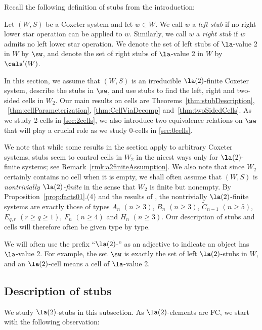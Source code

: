 Recall the following definition of {stubs} from the introduction:
\begin{definition} 
\label{def:stubs} Let $(W,S)$ be a Coxeter system and let $w\in W$. We call $w$ a \emph{left stub} if no right
      lower star operation can be applied to $w$. Similarly, we call $w$ a \emph{right stub} if $w$ admits no left
      lower star operation. We denote the set of left stubs of $\la$-value 2 in $W$ by $\sw$, and denote the set of
      right stubs of $\la$-value 2 in $W$ by $\cals'(W)$.
\end{definition} 

In this section, we assume that $(W,S)$ is an irreducible $\la(2)$-finite Coxeter system, describe
the stubs in $\sw$, and use stubs to find the left, right and two-sided cells in $W_2$. Our main
results on cells are Theorems~\ref{thm:stubDescription}, ~\ref{thm:cellParameterization},
\ref{thm:CellViaDecomp} and~\ref{thm:twoSidedCells}. As we study 2-cells in \autoref{sec:2cells}, we
also introduce two equivalence relations on $\sw$ that will play a crucial role as we study 0-cells
in \autoref{sec:0cells}.  

We note that while some results in the section apply to arbitrary Coxeter systems, stubs seem to
control cells in $W_2$ in the nicest ways only for $\la$(2)-finite systems; see
Remark~\ref{rmk:a2finiteAssumption}.  We also note that since $W_2$ certainly contains no cell when it is
empty, we shall often assume that $(W,S)$ is \emph{nontrivially $\la(2)$-finite} in the sense that
$W_2$ is finite but nonempty.  By Proposition~\ref{prop:facts01}.(4) and the results of \cite{GreenXu}, the
nontrivially $\la(2)$-finite systems are exactly those of types $A_n$ $(n\ge 3)$, $B_n$ $(n\ge 3)$, $\tilde
C_{n-1}$ $(n\ge 5)$, $E_{q,r}$ $(r\ge q\ge 1)$, $F_n$ $(n\ge 4)$ and $H_n$ $(n\ge 3)$. Our description of stubs
and cells will therefore often be given type by type. 

We will often use the prefix ``$\la(2)$-'' as an adjective to indicate an object has $\la$-value 2.
For example, the set $\sw$ is exactly the set of left $\la(2)$-stubs in $W$, and an $\la(2)$-cell
means a cell of $\la$-value 2.

\subsection{Description of stubs}
\label{sec:StubDescriptions} 
We study {$\la(2)$-stubs} in this subsection. As $\la(2)$-elements are FC, we start with the
following observation:

